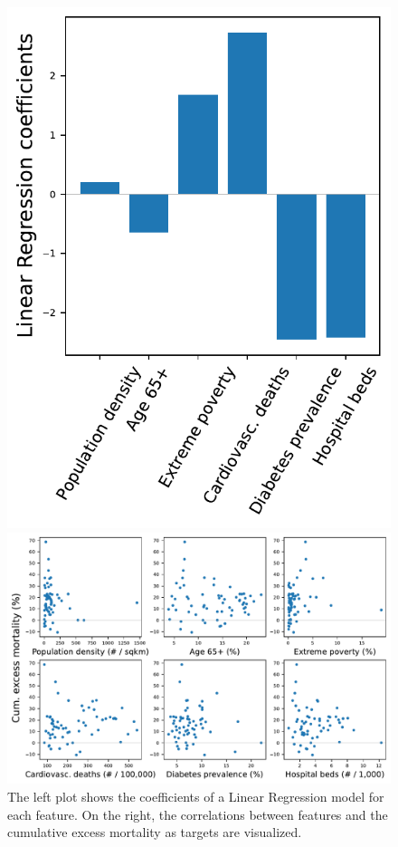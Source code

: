 \documentclass{article}
\begin{document}
\begin{figure}[t]
	\begin{minipage}{0.315\linewidth}
		\centering
		\includegraphics[width=0.91\linewidth]{fig/fig_linear_regression_em}
	\end{minipage}\hfill%
	\begin{minipage}{0.66\linewidth}
		\centering
		\includegraphics[width=0.91\linewidth]{fig/fig_em_correlation}
	\end{minipage}
	\caption[Linear Regression and Correlations]{The left plot shows the coefficients of a Linear Regression model for each feature. On the right, the correlations between features and the cumulative excess mortality as targets are visualized.}
	\label{fig:linear_regression}
\end{figure}
\end{document}
